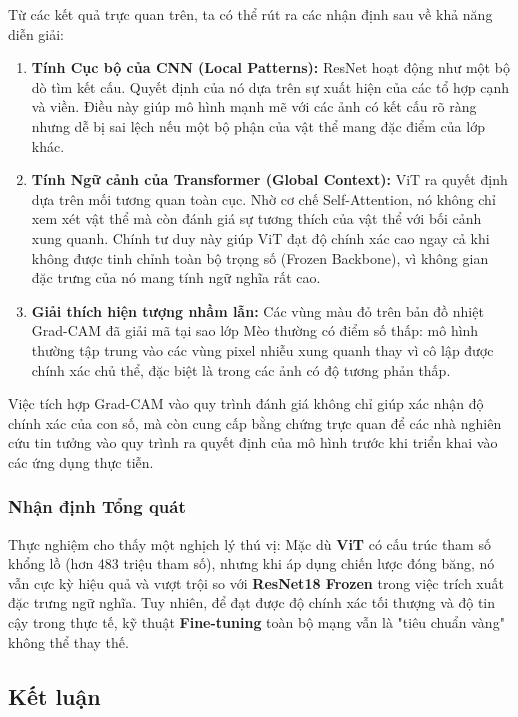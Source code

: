 \documentclass[a4paper]{article}
\theoremstyle{definition}
\begin{document}
Từ các kết quả trực quan trên, ta có thể rút ra các nhận định sau về khả năng diễn giải:
\begin{enumerate}
	\item \textbf{Tính Cục bộ của CNN (Local Patterns):} ResNet hoạt động như một bộ dò tìm kết cấu. Quyết định của nó dựa trên sự xuất hiện của các tổ hợp cạnh và viền. Điều này giúp mô hình mạnh mẽ với các ảnh có kết cấu rõ ràng nhưng dễ bị sai lệch nếu một bộ phận của vật thể mang đặc điểm của lớp khác.
	\item \textbf{Tính Ngữ cảnh của Transformer (Global Context):} ViT ra quyết định dựa trên mối tương quan toàn cục. Nhờ cơ chế Self-Attention, nó không chỉ xem xét vật thể mà còn đánh giá sự tương thích của vật thể với bối cảnh xung quanh. Chính tư duy này giúp ViT đạt độ chính xác cao ngay cả khi không được tinh chỉnh toàn bộ trọng số (Frozen Backbone), vì không gian đặc trưng của nó mang tính ngữ nghĩa rất cao.
	\item \textbf{Giải thích hiện tượng nhầm lẫn:} Các vùng màu đỏ trên bản đồ nhiệt Grad-CAM đã giải mã tại sao lớp Mèo thường có điểm số thấp: mô hình thường tập trung vào các vùng pixel nhiễu xung quanh thay vì cô lập được chính xác chủ thể, đặc biệt là trong các ảnh có độ tương phản thấp.
\end{enumerate}

Việc tích hợp Grad-CAM vào quy trình đánh giá không chỉ giúp xác nhận độ chính xác của con số, mà còn cung cấp bằng chứng trực quan để các nhà nghiên cứu tin tưởng vào quy trình ra quyết định của mô hình trước khi triển khai vào các ứng dụng thực tiễn.


\subsubsection{Nhận định Tổng quát}

Thực nghiệm cho thấy một nghịch lý thú vị: Mặc dù \textbf{ViT} có cấu trúc tham số khổng lồ (hơn 483 triệu tham số), nhưng khi áp dụng chiến lược đóng băng, nó vẫn cực kỳ hiệu quả và vượt trội so với \textbf{ResNet18 Frozen} trong việc trích xuất đặc trưng ngữ nghĩa. Tuy nhiên, để đạt được độ chính xác tối thượng và độ tin cậy trong thực tế, kỹ thuật \textbf{Fine-tuning} toàn bộ mạng vẫn là "tiêu chuẩn vàng" không thể thay thế.


\subsection{Kết luận}
\end{document}
